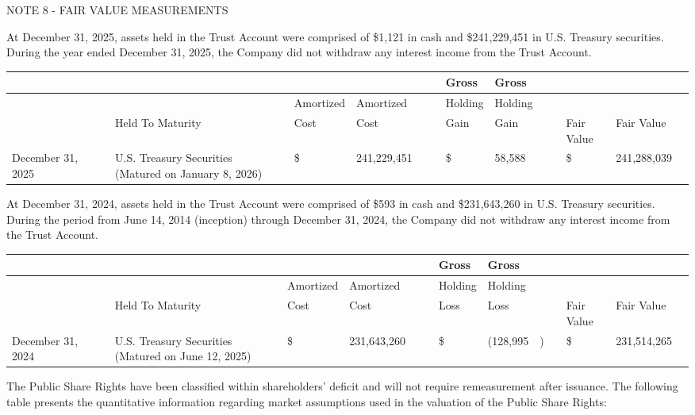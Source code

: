 \documentclass[11pt,a4paper]{article}
\begin{document}
NOTE 8 - FAIR VALUE MEASUREMENTS

At December 31, 2025, assets held in the Trust Account were comprised of \$1,121 in cash and \$241,229,451 in U.S. Treasury securities. During the year ended December 31, 2025, the Company did not withdraw any interest income from the Trust Account.

\begin{table}[h]
\begin{tabular}{|l|l|l|l|l|l|l|l|l|l|l|l|l|l|l|l|}
\hline
 &  &  &  &  &  &  &  &  & Gross & Gross &  &  &  &  &  \\ \hline
 &  &  &  &  & Amortized & Amortized &  &  & Holding & Holding &  &  &  &  &  \\ \hline
 &  &  & Held To Maturity &  & Cost & Cost &  &  & Gain & Gain &  &  & Fair Value & Fair Value &  \\ \hline
December 31, 2025 &  &  & U.S. Treasury Securities (Matured on January 8, 2026) &  & \$ & 241,229,451 &  &  & \$ & 58,588 &  &  & \$ & 241,288,039 &  \\ \hline
\end{tabular}
\end{table}

At December 31, 2024, assets held in the Trust Account were comprised of \$593 in cash and \$231,643,260 in U.S. Treasury securities. During the period from June 14, 2014 (inception) through December 31, 2024, the Company did not withdraw any interest income from the Trust Account.

\begin{table}[h]
\begin{tabular}{|l|l|l|l|l|l|l|l|l|l|l|l|l|l|l|l|}
\hline
 &  &  &  &  &  &  &  &  & Gross & Gross &  &  &  &  &  \\ \hline
 &  &  &  &  & Amortized & Amortized &  &  & Holding & Holding &  &  &  &  &  \\ \hline
 &  &  & Held To Maturity &  & Cost & Cost &  &  & Loss & Loss &  &  & Fair Value & Fair Value &  \\ \hline
December 31, 2024 &  &  & U.S. Treasury Securities (Matured on June 12, 2025) &  & \$ & 231,643,260 &  &  & \$ & (128,995 & ) &  & \$ & 231,514,265 &  \\ \hline
\end{tabular}
\end{table}

The Public Share Rights have been classified within shareholders' deficit and will not require remeasurement after issuance. The following table presents the quantitative information regarding market assumptions used in the valuation of the Public Share Rights:
\end{document}
